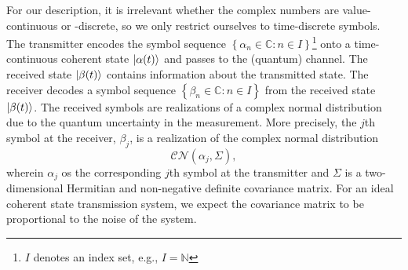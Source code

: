 For our description, it is irrelevant whether the complex numbers are value-continuous or -discrete, so we only restrict ourselves to time-discrete symbols.
The transmitter encodes the symbol sequence $\left\{\alpha_n\in\mathbb{C}\colon n\in I\right\}$\footnote{$I$ denotes an index set, e.g., $I=\mathbb{N}$} onto a time-continuous coherent state $\lvert\alpha(t)\rangle$ and passes to the (quantum) channel.
The received state $\lvert\beta(t)\rangle$ contains information about the transmitted state.
The receiver decodes a symbol sequence $\left\{\beta_n\in\mathbb{C}\colon n\in I\right\}$ from the received state $\lvert\beta(t)\rangle$.
The received symbols are realizations of a complex normal distribution due to the quantum uncertainty in the measurement.
More precisely, the $j$th symbol at the receiver, $\beta_j$, is a realization of the complex normal distribution
\begin{equation*}
	\mathcal{CN}\left(
		\alpha_j,
		\Sigma
	\right),
\end{equation*}
wherein $\alpha_j$ os the corresponding $j$th symbol at the transmitter and $\Sigma$ is a two-dimensional Hermitian and non-negative definite covariance matrix.
For an ideal coherent state transmission system, we expect the covariance matrix to be proportional to the noise of the system.